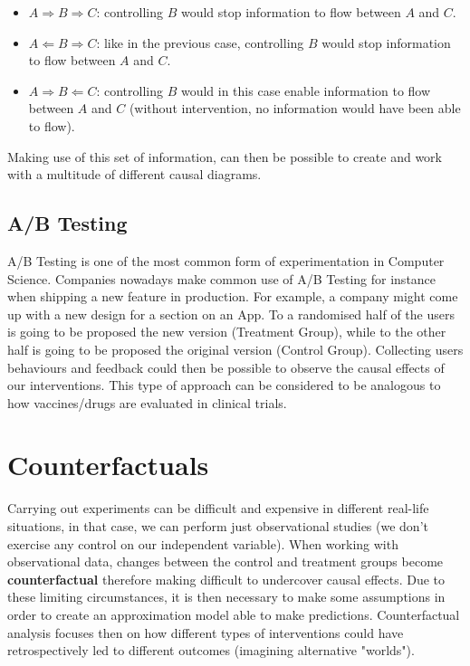 \begin{itemize}
    \item \textbf{$A \Rightarrow B \Rightarrow C$}: controlling $B$ would stop information to flow between $A$ and $C$.
    \item \textbf{$A \Leftarrow B \Rightarrow C$}: like in the previous case, controlling $B$ would stop information to flow between $A$ and $C$.
    \item \textbf{$A \Rightarrow B \Leftarrow C$}: controlling $B$ would in this case enable information to flow between $A$ and $C$ (without intervention, no information would have been able to flow).
\end{itemize}

Making use of this set of information, can then be possible to create and work with a multitude of different causal diagrams.

\vspace{-0.2cm}
\subsection{A/B Testing}
\label{testing}
\vspace{-0.2cm}
A/B Testing is one of the most common form of experimentation in Computer Science. Companies nowadays make common use of A/B Testing for instance when shipping a new feature in production. For example, a company might come up with a new design for a section on an App. To a randomised half of the users is going to be proposed the new version (Treatment Group), while to the other half is going to be proposed the original version (Control Group). Collecting users behaviours and feedback could then be possible to observe the causal effects of our interventions. This type of approach can be considered to be analogous to how vaccines/drugs are evaluated in clinical trials.

\section{Counterfactuals}
Carrying out experiments can be difficult and expensive in different real-life situations, in that case, we can perform just observational studies (we don't exercise any control on our independent variable). When working with observational data, changes between the control and treatment groups become \textbf{counterfactual} therefore making difficult to undercover causal effects. Due to these limiting circumstances, it is then necessary to make some assumptions in order to create an approximation model able to make predictions. Counterfactual analysis focuses then on how different types of interventions could have retrospectively led to different outcomes (imagining alternative "worlds"). 

